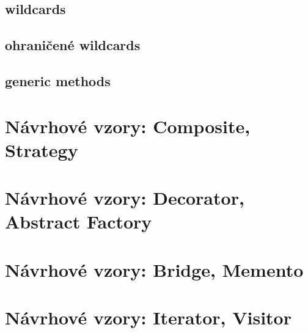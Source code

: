 \subsection*{wildcards}
\subsection*{ohraničené wildcards}
\subsection*{generic methods}

\section{Návrhové vzory: Composite, Strategy}

\section{Návrhové vzory: Decorator, Abstract Factory}

\section{Návrhové vzory: Bridge, Memento}

\section{Návrhové vzory: Iterator, Visitor}

